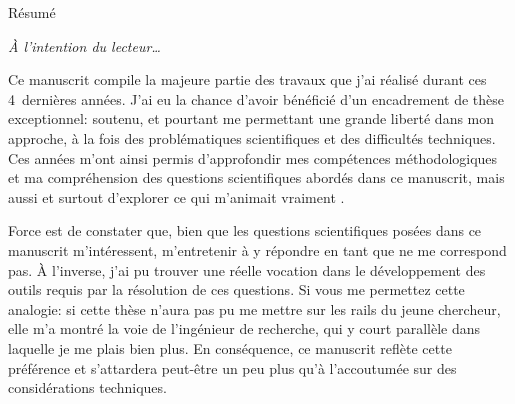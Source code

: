 
\thispagestyle{thesis-empty}

Résumé

\begin{comment}

\clearpage
\thispagestyle{thesis-empty}

\section*{Remerciements}
\label{sec:thanks}

la colloc étendu: théo, thomas, arthur, rémi, rémy, clément, sarah
parler du confinement ?
les potos: benjamin, marie, charlie, paul, jessie, piwi

la mifa

mon comité de thèse ? Sakina, Daniele

le 426 le meilleur bureau, tous les autres doctorants et post-doctorants et stagiaires
c'est quand même vachement plus fun avec elleux.

l'équipe admin du labo, bigup
\end{comment}

\clearpage
\thispagestyle{thesis-empty}

\vspace*{5ex}
\par\addvspace{\beforesecskip}\addvspace{\baselineskip}
\par\noindent\textit{À l'intention du lecteur\dots}\par
\vspace{\aftersecskip}

Ce manuscrit compile la majeure partie des travaux que j'ai réalisé durant ces 4~dernières années.
J'ai eu la chance d'avoir bénéficié d'un encadrement de thèse exceptionnel: soutenu, et pourtant me permettant une grande liberté dans mon approche, à la fois des problématiques scientifiques et des difficultés techniques.
Ces années m'ont ainsi permis d'approfondir mes compétences méthodologiques et ma compréhension des questions scientifiques abordés dans ce manuscrit, mais aussi et surtout d'explorer ce qui m'animait vraiment .

Force est de constater que, bien que les questions scientifiques posées dans ce manuscrit m'intéressent, m'entretenir à y répondre en tant que  ne me correspond pas.
À l'inverse, j'ai pu trouver une réelle vocation dans le développement des outils requis par la résolution de ces questions.
Si vous me permettez cette analogie: si cette thèse n'aura pas pu me mettre sur les rails du jeune chercheur, elle m'a montré la voie de l'ingénieur de recherche, qui y court parallèle dans laquelle je me plais bien plus.
En conséquence, ce manuscrit reflète cette préférence et s'attardera peut-être un peu plus qu'à l'accoutumée sur des considérations techniques.

